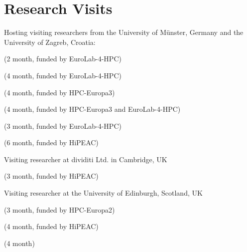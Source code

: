 \section{Research Visits}
\begin{cvitemize}
  \item Hosting visiting researchers from the University of Münster, Germany and the University of Zagreb, Croatia:
      \begin{inlineItemize}
        \item {} (2 month, funded by EuroLab-4-HPC)
        \item {} (4 month, funded by EuroLab-4-HPC)
        \item {} (4 month, funded by HPC-Europa3)
        \item {} (4 month, funded by HPC-Europa3 and EuroLab-4-HPC)
        \item {} (3 month, funded by EuroLab-4-HPC)
        \item {} (6 month, funded by HiPEAC)
      \end{inlineItemize}
   \item Visiting researcher at dividiti Ltd. in Cambridge, UK
      \begin{inlineItemize}
        \item {} (3 month, funded by HiPEAC)
      \end{inlineItemize}
    \item Visiting researcher at the University of Edinburgh, Scotland, UK
      \begin{inlineItemize}
        \item {} (3 month, funded by HPC-Europa2)
        \item {} (4 month, funded by HiPEAC)
        \item {} (4 month)
      \end{inlineItemize}
\end{cvitemize}
